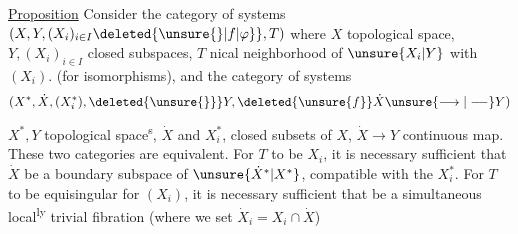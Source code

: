 \uline{Proposition} Consider the category of
systems $(X,Y,(X_i)_{i\in I}\deleted{\unsure{\}|f|\varphi}},T)$ where
$X$ topological space, $Y,(X_i)_{i\in I}$ closed subspaces,
$T$ nical neighborhood of $\unsure{X_i|Y}$
 with
$(X_i)$. (for isomorphisms), and the category
of systems
\[
(X^*,\dot X,(X_i^*),\deleted{\unsure{\}}}Y,
\deleted{\unsure{f}}\dot X\unsure{\longrightarrow|\mathrel{\relbar\joinrel\relbar}}Y)
\]
$X^*,Y$ topological space\textsuperscript{s}, $\dot X$ and $X_i^*$, closed subsets of $X$,
$\dot X\longrightarrow Y$ continuous map. These two
categories are equivalent.
For $T$
to be \uline{} 
 $X_i$,
it is necessary  sufficient that $\dot X$ be a boundary subspace
of $\unsure{\dot X^*|X^*}$,  compatible with the $X_i^*$.
For $T$ to be equisingular for
$(X_i)$, it is necessary  sufficient that
be a simultaneous local\textsuperscript{ly} trivial fibration
(where we set $\dot X_i=X_i\cap\dot X$)
